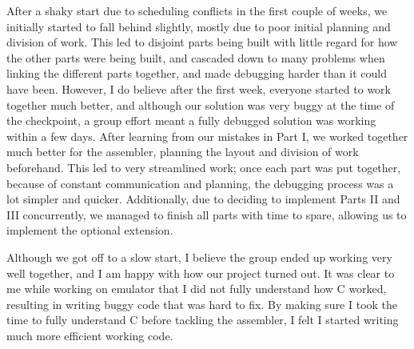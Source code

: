 \documentclass[11pt]{article}
\begin{document}
After a shaky start due to scheduling conflicts in the first couple of weeks, we initially 
started to fall behind slightly, mostly due to poor initial planning and division of work. This 
led to disjoint parts being built with little regard for how the other parts were being built, 
and cascaded down to many problems when linking the different parts together, and made debugging harder 
than it could have been. However, I do believe after the first week, everyone started to work 
together much better, and although our solution was very buggy at the time of the checkpoint, a 
group effort meant a fully debugged solution was working within a few days. After learning from 
our mistakes in Part I, we worked together much better for the assembler, planning the layout 
and division of work beforehand. This led to very streamlined work; once each part was put 
together, because of constant communication and planning, the debugging process was a lot 
simpler and quicker. Additionally, due to deciding to implement Parts II and III concurrently, 
we managed to finish all parts with time to spare, allowing us to implement the optional
extension.

Although we got off to a slow start, I believe the group ended up working very well 
together, and I am happy with how our project turned out. It was clear to me while working on 
emulator that I did not fully understand how C worked, resulting in writing buggy code that was 
hard to fix. By making sure I took the time to fully understand C before tackling the 
assembler, I felt I started writing much more efficient working code.
\end{document}
